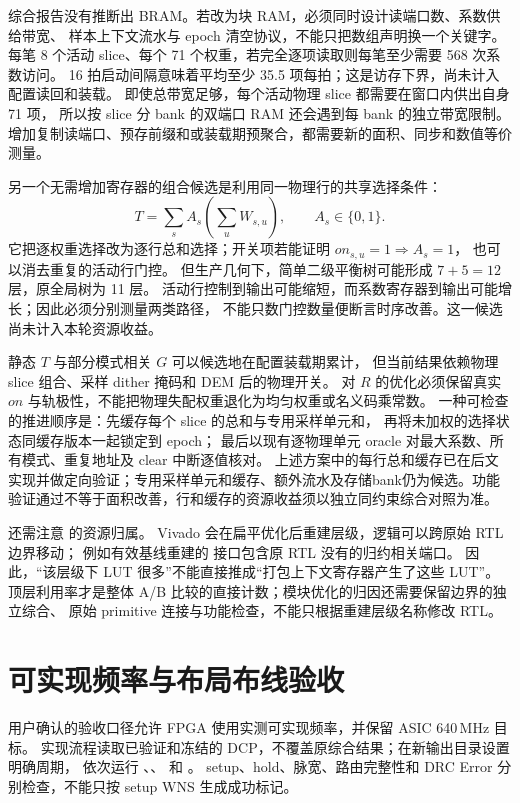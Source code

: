 综合报告没有推断出 BRAM。若改为块 RAM，必须同时设计读端口数、系数供给带宽、
样本上下文流水与 epoch 清空协议，不能只把数组声明换一个关键字。
每笔 8 个活动 slice、每个 71 个权重，若完全逐项读取则每笔至少需要 568 次系数访问。
16 拍启动间隔意味着平均至少 35.5 项每拍；这是访存下界，尚未计入配置读回和装载。
即使总带宽足够，每个活动物理 slice 都需要在窗口内供出自身 71 项，
所以按 slice 分 bank 的双端口 RAM 还会遇到每 bank 的独立带宽限制。
增加复制读端口、预存前缀和或装载期预聚合，都需要新的面积、同步和数值等价测量。

另一个无需增加寄存器的组合候选是利用同一物理行的共享选择条件：
\begin{equation}
T=\sum_s A_s\!\left(\sum_u W_{s,u}\right),\qquad A_s\in\{0,1\}.
\end{equation}
它把逐权重选择改为逐行总和选择；开关项若能证明 \(on_{s,u}=1\Rightarrow A_s=1\)，
也可以消去重复的活动行门控。
但生产几何下，简单二级平衡树可能形成 \(7+5=12\) 层，原全局树为 11 层。
活动行控制到输出可能缩短，而系数寄存器到输出可能增长；因此必须分别测量两类路径，
不能只数门控数量便断言时序改善。这一候选尚未计入本轮资源收益。

静态 \(T\) 与部分模式相关 \(G\) 可以候选地在配置装载期累计，
但当前结果依赖物理 slice 组合、采样 dither 掩码和 DEM 后的物理开关。
对 \(R\) 的优化必须保留真实 \(on\) 与轨极性，不能把物理失配权重退化为均匀权重或名义码乘常数。
一种可检查的推进顺序是：先缓存每个 slice 的总和与专用采样单元和，
再将未加权的选择状态同缓存版本一起锁定到 epoch；
最后以现有逐物理单元 oracle 对最大系数、所有模式、重复地址及 clear 中断逐值核对。
上述方案中的每行总和缓存已在后文实现并做定向验证；专用采样单元和缓存、额外流水及存储bank仍为候选。功能验证通过不等于面积改善，行和缓存的资源收益须以独立同约束综合对照为准。

还需注意  的资源归属。
Vivado 会在扁平优化后重建层级，逻辑可以跨原始 RTL 边界移动；
例如有效基线重建的  接口包含原 RTL 没有的归约相关端口。
因此，“该层级下 LUT 很多”不能直接推成“打包上下文寄存器产生了这些 LUT”。
顶层利用率才是整体 A/B 比较的直接计数；模块优化的归因还需要保留边界的独立综合、
原始 primitive 连接与功能检查，不能只根据重建层级名称修改 RTL。

\section{可实现频率与布局布线验收}
用户确认的验收口径允许 FPGA 使用实测可实现频率，并保留 ASIC 640\,MHz 目标。
实现流程读取已验证和冻结的 DCP，不覆盖原综合结果；在新输出目录设置明确周期，
依次运行 、、 和 。
setup、hold、脉宽、路由完整性和 DRC Error 分别检查，不能只按 setup WNS 生成成功标记。

